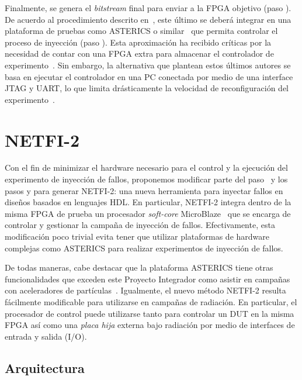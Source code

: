 \documentclass[a4paper,openright,12pt]{report}
\newcommand*\circled[1]{\tikz[baseline=(char.base)]{
            \node[shape=circle,draw,inner sep=0.7pt] (char) {#1};}}
\begin{document}
Finalmente, se genera el \emph{bitstream} final para enviar a la FPGA objetivo (paso \circled{3}). De acuerdo al procedimiento descrito en~\cite{Mansour2013-2}, este último se deberá integrar en una plataforma de pruebas como ASTERICS o similar~\cite{Velazco2001} que permita controlar el proceso de inyección (paso \circled{4}). Esta aproximación ha recibido críticas por la necesidad de contar con una FPGA extra para almacenar el controlador de experimento~\cite{Serrano2015}. Sin embargo, la alternativa que plantean estos últimos autores se basa en ejecutar el controlador en una PC conectada por medio de una interface JTAG y UART, lo que limita drásticamente la velocidad de reconfiguración del experimento~\cite{Alaminos2012}.

\section{ NETFI-2}
\label{DescripcionNetfi2}Con el fin de minimizar el hardware necesario para el control y la ejecución del experimento de inyección de fallos, proponemos modificar parte del paso~\circled{2} y los pasos \circled{3} y \circled{4} para generar \mbox{NETFI-2}: una nueva herramienta para inyectar fallos en diseños basados en lenguajes HDL. En particular, NETFI-2 integra dentro de la misma FPGA de prueba un procesador \emph{soft-core} MicroBlaze~\cite{uBlaze} que se encarga de controlar y gestionar la campaña de inyección de fallos. Efectivamente, esta modificación poco trivial evita tener que utilizar plataformas de hardware complejas como ASTERICS para realizar experimentos de inyección de fallos. 

De todas maneras, cabe destacar que la plataforma ASTERICS tiene otras funcionalidades que exceden este Proyecto Integrador como asistir en campañas con aceleradores de partículas~\cite{Velazco2001}. Igualmente, el nuevo método NETFI-2 resulta fácilmente modificable para utilizarse en campañas de radiación. En particular, el procesador de control puede utilizarse tanto para controlar un DUT en la misma FPGA así como una \emph{placa hija} externa bajo radiación por medio de interfaces de entrada y salida (I/O). 

\subsection{Arquitectura}
\end{document}
